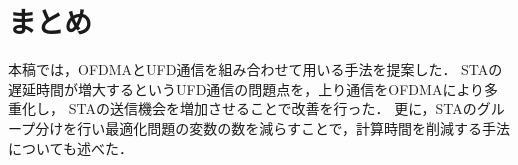 \documentclass[technicalreport]{ieicej}
\begin{document}
\section{まとめ}
	本稿では，OFDMAとUFD通信を組み合わせて用いる手法を提案した．
	STAの遅延時間が増大するというUFD通信の問題点を，上り通信をOFDMAにより多重化し，
	STAの送信機会を増加させることで改善を行った．
	更に，STAのグループ分けを行い最適化問題の変数の数を減らすことで，計算時間を削減する手法についても述べた．



\end{document}
